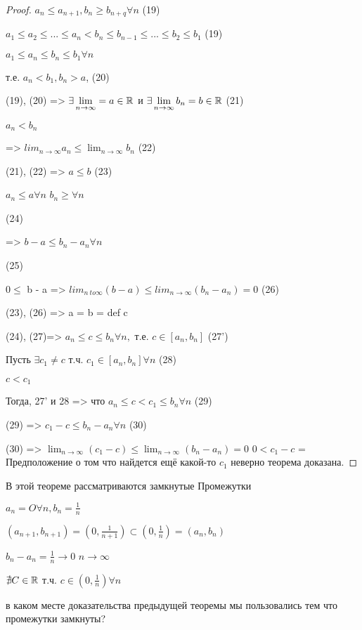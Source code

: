 \begin{proof}
    $a_n \leq a_{n + 1}, b_n \geq b_{n + q} \forall n$ (19)

    $a_1 \leq a_2 \leq ... \leq a_n < b_n \leq b_{n-1} \leq ... \leq b_2 \leq b_1$ (19)

    $a_1 \leq a_n \leq b_n \leq b_1 \forall n$

    т.е. $a_n < b_1, b_n > a$, (20)

    (19), (20) => $\exists \lim_{n \to \infty} = a \in \R$
    и $\exists \lim_{n \to \infty} b_n = b \in \R$ (21)
    
    $a_n < b_n$

    => $lim_{n \to \infty} a_n \leq \lim_{n \to \infty} b_n$ (22)

    (21), (22) => $a \leq b$ (23)
    
    $a_n \leq a \forall n$
    $b_n \geq \forall n$

    (24)

    => $b - a \leq b_n - a_n \forall n$

    (25)

    $0 \leq $ b - a => $lim_{n \ to \infty} (b - a) \leq lim_{n \to \infty} (b_n - a_n) = 0$ (26)

    (23), (26) => a = b = def c

    (24), (27)=> $a_n \leq c \leq b_n \forall n, $ т.е. $c \in [a_n, b_n]$ (27')

    Пусть $\exists c_1 \neq c$ т.ч. $c_1 \in [a_n, b_n] \forall n$ (28)

    $c < c_1$

    Тогда, 27' и 28 => что $a_n \leq c < c_1 \leq b_n \forall n$ (29)

    (29) => $c_1 - c \leq b_n - a_n \forall n$ (30)

    (30) => $\lim_{n \to \infty} (c_1 - c) \leq \lim_{n \to \infty} (b_n - a_n) = 0$
    $0 < c_1 -c$ = 
    Предположение о том что найдется ещё какой-то $c_1$ неверно
    теорема доказана.

    





\end{proof}

\begin{remark}
    В этой теореме рассматриваются замкнутые Промежутки

    \begin{eg}
        $a_n = O \forall n, b_n = \frac{1}{n}$

        $(a_{n + 1}, b_{n + 1}) = (0, \frac{1}{n+1}) \subset (0, \frac{1}{n}) = (a_n, b_n)$

        $b_n - a_n = \frac{1}{n} \to 0$
        $n \to \infty$

        $\nexists C \in \mathbb{R}$ т.ч. $ c \in (0, \frac{1}{n}) \forall n$
    \end{eg}

    в каком месте доказательства предыдущей теоремы мы пользовались тем что промежутки замкнуты?
\end{remark}

